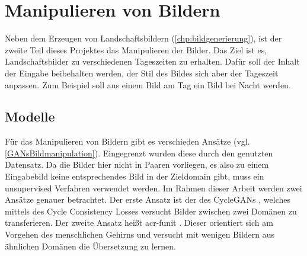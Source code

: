 \chapter{Manipulieren von Bildern}\label{chp:bildmanipulation} %
\glsresetall

Neben dem Erzeugen von Landschaftsbildern (\cref{chp:bildgenerierung}), ist der
zweite Teil dieses Projektes das Manipulieren der Bilder. Das Ziel ist es,
Landschaftsbilder zu verschiedenen Tageszeiten zu erhalten. Dafür soll der
Inhalt der Eingabe beibehalten werden,  der Stil des Bildes sich aber der
Tageszeit anpassen. Zum Beispiel soll aus einem Bild am Tag ein Bild bei Nacht
werden.
 
 \section{Modelle} %
 Für das Manipulieren von Bildern gibt es verschieden Ansätze (vgl. \cref{GANsBildmanipulation}). Eingegrenzt
 wurden diese durch den genutzten Datensatz. Da die Bilder hier nicht in Paaren vorliegen, es
 also zu einem Eingabebild keine entsprechendes Bild in der Zieldomain gibt,
 muss ein unsupervised Verfahren verwendet werden.
 Im Rahmen dieser Arbeit werden zwei Ansätze genauer betrachtet. Der erste
 Ansatz ist der des CycleGANs \cite{zhu2017unpaired}, welches mittels des Cycle
 Consistency Losses versucht Bilder zwischen zwei Domänen zu transferieren. Der
 zweite Ansatz heißt  \gls{acr-funit} \cite{liu2019few}. Dieser orientiert sich am
 Vorgehen des menschlichen Gehirns und versucht mit wenigen Bildern aus
 ähnlichen Domänen die Übersetzung zu lernen.
 

